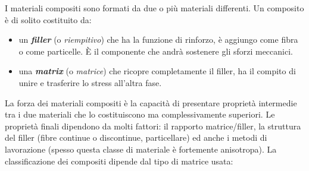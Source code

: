 \documentclass{article}
\begin{document}
I materiali compositi sono formati da due o più materiali differenti. Un composito è di solito costituito da: 
\begin{itemize}
    \item un \textbf{\textit{filler}} (o \textit{riempitivo}) che ha la funzione di rinforzo, è aggiungo come fibra o come particelle. È il componente che andrà  sostenere gli sforzi meccanici.
    \item  una \textit{\textbf{matrix}} (o \textit{matrice}) che ricopre completamente il filler, ha il compito di unire e trasferire lo stress all'altra fase.
\end{itemize}
La forza dei materiali compositi è la capacità di presentare proprietà intermedie tra i due materiali che lo costituiscono ma complessivamente superiori. Le proprietà finali dipendono da molti fattori: il rapporto matrice/filler, la struttura del filler (fibre continue o discontinue, particellare) ed anche i metodi di lavorazione (spesso questa classe di materiale è fortemente anisotropa). 
La classificazione dei compositi dipende dal tipo di matrice usata:
\end{document}
